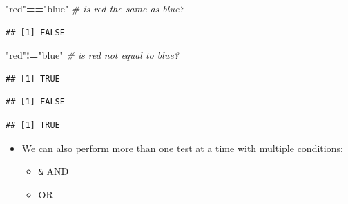\documentclass[]{book}
\newenvironment{Shaded}{\begin{snugshade}}{\end{snugshade}}
\newcommand{\KeywordTok}[1]{\textcolor[rgb]{0.13,0.29,0.53}{\textbf{#1}}}
\newcommand{\StringTok}[1]{\textcolor[rgb]{0.31,0.60,0.02}{#1}}
\newcommand{\CommentTok}[1]{\textcolor[rgb]{0.56,0.35,0.01}{\textit{#1}}}
\newcommand{\OperatorTok}[1]{\textcolor[rgb]{0.81,0.36,0.00}{\textbf{#1}}}
\newcommand{\NormalTok}[1]{#1}
\providecommand{\tightlist}{%
  \setlength{\itemsep}{0pt}\setlength{\parskip}{0pt}}
\theoremstyle{definition}
\theoremstyle{definition}
\theoremstyle{definition}
\theoremstyle{remark}
\begin{document}
\begin{Shaded}
\begin{Highlighting}[]
\StringTok{"red"}\OperatorTok{==}\StringTok{"blue"} \CommentTok{# is red the same as blue?}
\end{Highlighting}
\end{Shaded}

\begin{verbatim}
## [1] FALSE
\end{verbatim}

\begin{Shaded}
\begin{Highlighting}[]
\StringTok{"red"}\OperatorTok{!=}\StringTok{"blue"} \CommentTok{# is red not equal to blue?}
\end{Highlighting}
\end{Shaded}

\begin{verbatim}
## [1] TRUE
\end{verbatim}

\begin{Shaded}
\end{Shaded}

\begin{verbatim}
## [1] FALSE
\end{verbatim}

\begin{Shaded}
\end{Shaded}

\begin{verbatim}
## [1] TRUE
\end{verbatim}

\begin{itemize}
\tightlist
\item
  We can also perform more than one test at a time with multiple
  conditions:

  \begin{itemize}
  \tightlist
  \item
    \texttt{\&} AND
  \item
    \texttt{\textbar{}} OR
  \end{itemize}
\end{itemize}
\end{document}
